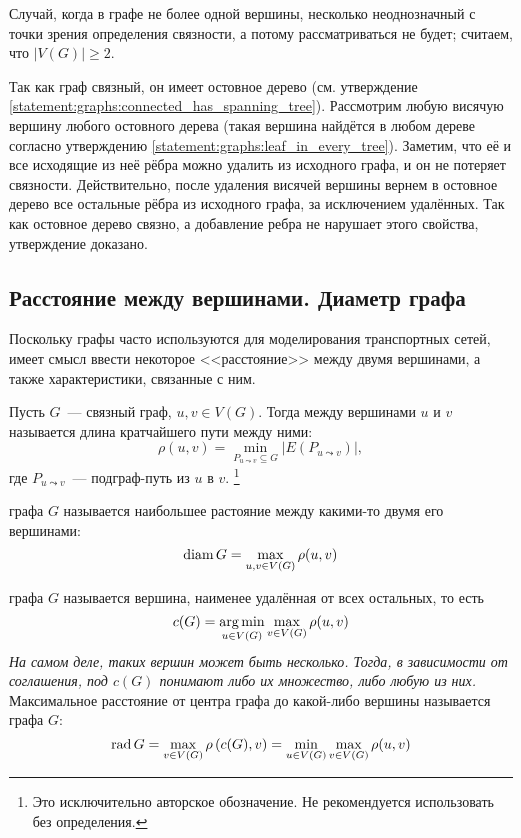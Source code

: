 \begin{Answer}
    \noindent
    Случай, когда в графе не более одной вершины, несколько неоднозначный с точки зрения определения связности,
    а потому рассматриваться не будет;
    считаем, что $ |V(G)| \geqslant 2 $.

    Так как граф связный, он имеет остовное дерево (см. утверждение \ref{statement:graphs:connected_has_spanning_tree}).
    Рассмотрим любую висячую вершину любого остовного дерева
    (такая вершина найдётся в любом дереве согласно утверждению \ref{statement:graphs:leaf_in_every_tree}).
    Заметим, что её и все исходящие из неё рёбра можно удалить из исходного графа,
    и он не потеряет связности.
    Действительно, после удаления висячей вершины вернем в остовное дерево все остальные рёбра из исходного графа,
    за исключением удалённых.
    Так как остовное дерево связно, а добавление ребра не нарушает этого свойства, утверждение доказано.
\end{Answer}



\subsection{Расстояние между вершинами. Диаметр графа}
\label{subsec:graphs:dist_and_diam}

Поскольку графы часто используются для моделирования транспортных сетей, имеет смысл ввести некоторое <<расстояние>> между двумя вершинами, а также характеристики, связанные с ним.

\begin{definition}
    Пусть $ G $~--- связный граф, $ u, v \in V(G) $.
    Тогда  между вершинами $ u $ и $ v $ называется длина кратчайшего пути между ними:
    \[
        \rho(u, v) = \min_{P_{u \leadsto v} \subseteq G} |E(P_{u \leadsto v})|,
    \]
    где $ P_{u \leadsto v} $~--- подграф-путь из $ u $ в $ v $.%
    \footnote{Это исключительно авторское обозначение. Не рекомендуется использовать без определения.}
\end{definition}

\begin{definition}
     графа $ G $ называется наибольшее растояние между какими-то двумя его вершинами:
    \[
        \operatorname{\textnormal{diam}} G = \max_{u, v \in V(G)} \rho(u, v)
    \]
\end{definition}

\begin{definition}
     графа $ G $ называется вершина, наименее удалённая от всех остальных, то есть
    \[
        c(G) = \operatorname*{\arg\min}_{u \in V(G)} \max_{v \in V(G)} \rho(u, v)
    \]
    \textit{На самом деле, таких вершин может быть несколько. Тогда, в зависимости от соглашения, под $ c(G) $ понимают либо их множество, либо любую из них.}
    Максимальное расстояние от центра графа до какой-либо вершины называется  графа $ G $:
    \[
        \operatorname{\textnormal{rad}} G = \max_{v \in V(G)} \rho\left( c(G), v \right) = \min_{u \in V(G)} \max_{v \in V(G)} \rho(u, v)
    \]
\end{definition}


